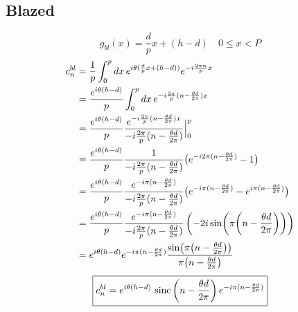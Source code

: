 \documentclass[12pt]{article}
\DeclareMathOperator{\sinc}{sinc} %
\begin{document}
\subsection{Blazed}
\begin{equation}
    g_{bl}(x) = \frac{d}{p}x + (h-d) \quad 0 \leq x < P
\end{equation}
\begin{align*}
    c_n^{bl} &= \frac{1}{p} \int_{0}^{p} dx \,
        e^{i \theta (\frac{d}{p}x + (h-d))} e^{-i \frac{2\pi n}{p} x} \\
    &= \frac{e^{i \theta (h-d)}}{p} \int_{0}^{p} dx \, 
        e^{-i \frac{2\pi}{p} (n - \frac{\theta d}{2\pi}) x} \\
    &= \frac{e^{i \theta (h-d)}}{p}
        \frac{e^{-i \frac{2\pi}{p} (n - \frac{\theta d}{2\pi}) x}}{-i \frac{2\pi}{p} (n - \frac{\theta d}{2\pi})} \Big|_{0}^{p} \\
    &= \frac{e^{i \theta (h-d)}}{p} \frac{1}{-i \frac{2\pi}{p} (n - \frac{\theta d}{2\pi})}         
        \big(e^{-i 2\pi (n - \frac{\theta d}{2\pi})} - 1\big) \\
    &= \frac{e^{i \theta (h-d)}}{p} \frac{e^{-i \pi (n - \frac{\theta d}{2\pi})}}{-i \frac{2\pi}{p} (n - \frac{\theta d}{2\pi})} 
        \big(e^{-i \pi (n - \frac{\theta d}{2\pi})} - e^{i \pi (n - \frac{\theta d}{2\pi})}\big) \\
    &= \frac{e^{i \theta (h-d)}}{p} \frac{e^{-i \pi (n - \frac{\theta d}{2\pi})}}{-i \frac{2\pi}{p} (n - \frac{\theta d}{2\pi})} 
        \left(-2i \sin(\pi \qty(n - \frac{\theta d}{2\pi}))\right) \\
    &= e^{i \theta (h-d)} e^{-i \pi (n - \frac{\theta d}{2\pi})}
        \frac{\sin(\pi \qty(n - \frac{\theta d}{2\pi}))}{\pi \qty(n - \frac{\theta d}{2\pi})} \\
\end{align*}
\begin{equation}
    \boxed{c_n^{bl} = e^{i \theta (h-d)} \, 
    \sinc\qty(n - \frac{\theta d}{2\pi}) \,
    e^{-i \pi (n - \frac{\theta d}{2\pi})}}
\end{equation}
\end{document}
